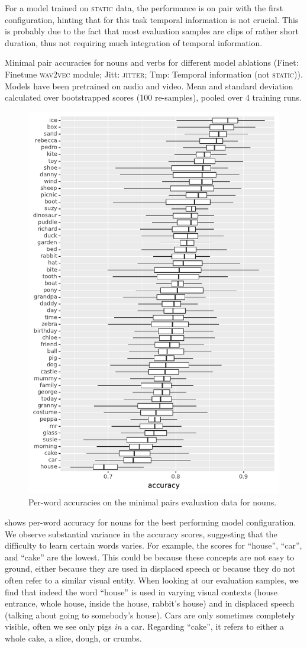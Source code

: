 For a model trained on \textsc{static} data, the performance is on pair with 
the first configuration, hinting that for this task temporal information is not 
crucial. This is probably due to the fact that most evaluation samples are 
clips of rather short duration, thus not requiring much integration of 
temporal information.
\begin{table}[htb]
	
	\caption{Minimal pair accuracies for nouns and verbs for different model 
		ablations (Finet: Finetune \textsc{wav2vec} module; 
		Jitt: \textsc{jitter}; Tmp: Temporal information (not \textsc{static})). 
		Models have been pretrained on audio and video. Mean and standard 
		deviation calculated over bootstrapped scores (100 re-samples), pooled 
		over 4 training runs.}
	\label{tab:minimal_pair_results}
\end{table}


\begin{figure}[htb]
  \centering
  \includegraphics[width=.5\textwidth]{results/targeted_triplets/acc_per_word_NOUN.pdf}
  \caption{Per-word accuracies on the minimal pairs evaluation data for nouns.}
  \label{fig:accuracy_targeted_triplets_nouns}
\end{figure}

 shows per-word
accuracy for nouns for the best performing model configuration.
We observe substantial variance in the accuracy scores, suggesting that the 
difficulty to learn certain words varies. For example, the 
scores for ``house'', ``car'', and ``cake'' are the lowest. This could be 
because these concepts are not easy to ground, either because they are used in 
displaced speech or because they do not often refer to a similar visual entity. 
When looking at our evaluation samples, we find that indeed the word ``house'' 
is used in varying visual contexts (house entrance, whole house, inside the
house, rabbit's house) and in displaced speech (talking about going 
to somebody's house). Cars are only sometimes completely visible, often we see 
only pigs \textit{in} a car. Regarding ``cake'', it refers to either a 
whole cake, a slice, dough, or crumbs.

